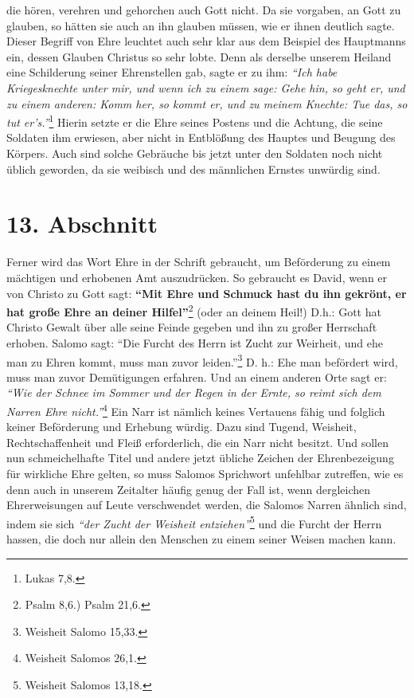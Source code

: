 die hören, verehren und gehorchen auch Gott nicht. Da sie vorgaben, an Gott zu
glauben, so hätten sie auch an ihn glauben müssen, wie er ihnen deutlich sagte.
Dieser Begriff von Ehre leuchtet auch sehr klar aus dem Beispiel des
Hauptmanns ein, dessen Glauben Christus so sehr lobte. Denn als derselbe unserem
Heiland eine Schilderung seiner Ehrenstellen
 gab, sagte er zu ihm:
\textit{"`Ich habe
Kriegesknechte unter mir, und wenn ich zu einem sage: Gehe hin, so geht er, und
zu einem anderen: Komm her, so kommt er, und zu meinem Knechte: Tue das, so tut
er’s."'}\footnote{Lukas 7,8.}
Hierin setzte er die Ehre seines Postens und die
Achtung, die seine Soldaten ihm erwiesen, aber nicht
in
Entblößung des Hauptes
und Beugung des Körpers. Auch sind solche Gebräuche bis jetzt unter den Soldaten
noch nicht üblich geworden, da sie weibisch und des männlichen
Ernstes unwürdig
sind.

\section{13. Abschnitt} \label{kap9_ab13}

Ferner wird das Wort Ehre in der Schrift gebraucht, um Beförderung zu einem
mächtigen und erhobenen Amt auszudrücken. So gebraucht es
David, wenn er von
Christo zu Gott sagt:
\textbf{"`Mit Ehre und Schmuck hast du ihn gekrönt, er hat große
Ehre an deiner Hilfel"'}\footnote{Psalm 8,6.) Psalm 21,6.}
(oder an deinem Heil!) D.h.: Gott hat Christo Gewalt über alle seine Feinde
gegeben und ihn zu großer
Herrschaft erhoben. Salomo sagt:
"`Die Furcht des Herrn ist Zucht zur Weirheit,
und ehe man zu Ehren kommt, muss man zuvor leiden."'\footnote{Weisheit Salomo
15,33.}
D. h.: Ehe man befördert wird, muss man zuvor Demütigungen
erfahren. Und an
einem anderen Orte sagt er:
\textit{"`Wie der Schnee im Sommer und der Regen in der
Ernte, so reimt sich dem Narren Ehre nicht."'}\footnote{Weisheit Salomos 26,1.}
Ein Narr ist
nämlich keines Vertauens fähig und folglich keiner Beförderung und Erhebung
würdig. Dazu sind Tugend, Weisheit, Rechtschaffenheit und Fleiß erforderlich,
die ein Narr nicht besitzt. Und sollen nun schmeichelhafte Titel und andere
jetzt übliche Zeichen der Ehrenbezeigung für wirkliche Ehre gelten, so muss
Salomos Sprichwort unfehlbar zutreffen, wie es denn auch in unserem Zeitalter
häufig genug der Fall ist, wenn dergleichen Ehrerweisungen auf Leute
verschwendet werden, die Salomos Narren ähnlich sind, indem sie sich
\textit{"`der Zucht der Weisheit entziehen"'}\footnote{Weisheit Salomos 13,18.}
und die Furcht der
Herrn hassen, die doch nur allein den Menschen zu einem seiner Weisen machen
kann.


